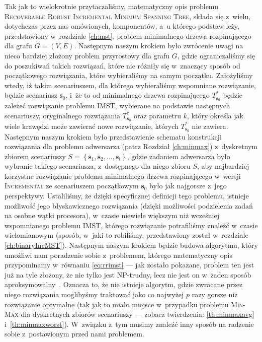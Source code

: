 Tak jak to wielokrotnie przytaczaliśmy, matematyczny opis problemu \textsc{Recoverable Robust Incremental Minimum Spanning Tree}, składa się z~wielu, dotychczas przez nas omówionych, komponentów, a~u którego podstaw leży, przedstawiony w~rozdziale \ref{ch:mst}, problem minimalnego drzewa rozpinającego dla grafu $G = \left( V, E \right)$. Następnym naszym krokiem było zwrócenie uwagi na nieco bardziej złożony problem przyrostowy dla grafu $G$, gdzie ograniczaliśmy się do poszukiwań takich rozwiązań, które nie różniły się w~znaczący sposób od początkowego rozwiązania, które wybieraliśmy na samym początku. Założyliśmy wtedy, iż takim scenariuszem, dla którego wybieraliśmy wspomniane rozwiązanie, będzie scenariusz $\textbf{s}_{0}$, i~że to od minimalnego drzewa rozpinającego $T^{\ast}_{\textbf{s}_{0}}$ będzie zależeć rozwiązanie problemu \textsc{IMST}, wybierane na podstawie następnych scenariuszy, oryginalnego rozwiązania $T^{\ast}_{\textbf{s}_{0}}$ oraz parametru $k$, który określa jak wiele krawędzi może zawierać nowe rozwiązanie, których $T^{\ast}_{\textbf{s}_{0}}$ nie zawiera. Następnym naszym krokiem było przedstawienie schematu konstrukcji rozwiązania dla problemu adwersarza (patrz Rozdział \ref{ch:minmax}) z~dyskretnym zbiorem scenariuszy $S = \left\{ \textbf{s}_{1}, \textbf{s}_{2}, \dots, \textbf{s}_{l} \right\}$, gdzie zadaniem adwersarza było wybranie takiego scenariusza, z~dostępnego dla niego zbioru $S$, aby najbardziej korzystne rozwiązanie problemu minimalnego drzewa rozpinającego w~wersji \textsc{Incremental} ze scenariuszem początkowym $\textbf{s}_{0}$ było jak najgorsze z~jego perspektywy. Ustaliliśmy, że dzięki specyficznej definicji tego problemu, istnieje możliwość jego błyskawicznego rozwiązania (dzięki możliwości podzielenia zadań na osobne wątki procesora), w~czasie niewiele większym niż wcześniej wspomnianego problemu \textsc{IMST}, którego rozwiązanie potrafiliśmy znaleźć w~czasie wielomianowym (sposób, w~jaki to robiliśmy, przedstawiony został w~rozdziale \ref{ch:binaryIncMST}). Następnym naszym krokiem będzie budowa algorytmu, który umożliwi nam poradzenie sobie z~problemem, którego matematyczny opis przypominamy w~równaniu \ref{eq:rrimst} --- jak zostało pokazane, problem ten jest już na tyle złożony, że nie tylko jest \textsc{NP}-trudny, lecz nie jest on w~żaden sposób aproksymowalny~\cite[twierdzenie $6$]{Kasperski2014}. Oznacza to, że nie istnieje algorytm, gdzie zwracane przez niego rozwiązania moglibyśmy traktować jako co najwyżej $p$ razy gorsze niż rozwiązanie optymalne (tak jak to miało miejsce w~przypadku problemu \textsc{Min-Max} dla dyskretnych zbiorów scenariuszy --- zobacz twierdzenia: \ref{th:minmaxavg} i~\ref{th:minmaxworst}). W~związku z~tym musimy znaleźć inny sposób na radzenie sobie z~postawionym przed nami problemem.

